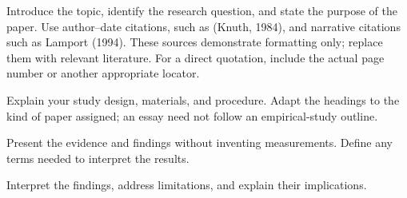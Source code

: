 Introduce the topic, identify the research question, and state the purpose
of the paper. Use author--date citations, such as (Knuth, 1984), and narrative
citations such as Lamport (1994). These sources demonstrate formatting only;
replace them with relevant literature. For a direct quotation, include the
actual page number or another appropriate locator.

Explain your study design, materials, and procedure. Adapt the headings to
the kind of paper assigned; an essay need not follow an empirical-study outline.

Present the evidence and findings without inventing measurements. Define
any terms needed to interpret the results.

Interpret the findings, address limitations, and explain their implications.
